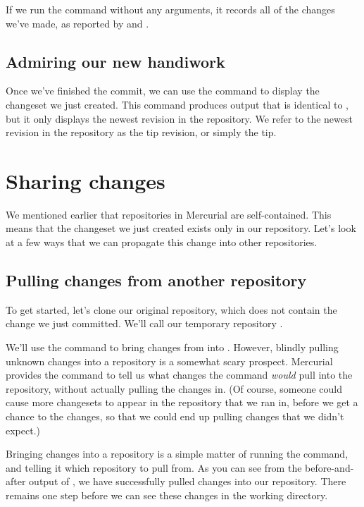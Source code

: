 If we run the  command without any arguments, it records
all of the changes we've made, as reported by  and
.

\subsection{Admiring our new handiwork}

Once we've finished the commit, we can use the  command to
display the changeset we just created.  This command produces output
that is identical to , but it only displays the newest
revision in the repository.
We refer to the newest revision in the repository as the tip revision,
or simply the tip.

\section{Sharing changes}

We mentioned earlier that repositories in Mercurial are
self-contained.  This means that the changeset we just created exists
only in our  repository.  Let's look at a few ways
that we can propagate this change into other repositories.

\subsection{Pulling changes from another repository}
\label{sec:tour:pull}

To get started, let's clone our original  repository,
which does not contain the change we just committed.  We'll call our
temporary repository .

We'll use the  command to bring changes from
 into .  However, blindly
pulling unknown changes into a repository is a somewhat scary
prospect.  Mercurial provides the  command to tell us
what changes the  command \emph{would} pull into the
repository, without actually pulling the changes in.
(Of course, someone could cause more changesets to appear in the
repository that we ran  in, before we get a chance to
 the changes, so that we could end up pulling changes that we
didn't expect.)

Bringing changes into a repository is a simple matter of running the
 command, and telling it which repository to pull from.
As you can see from the before-and-after output of , we
have successfully pulled changes into our repository.  There remains
one step before we can see these changes in the working directory.

